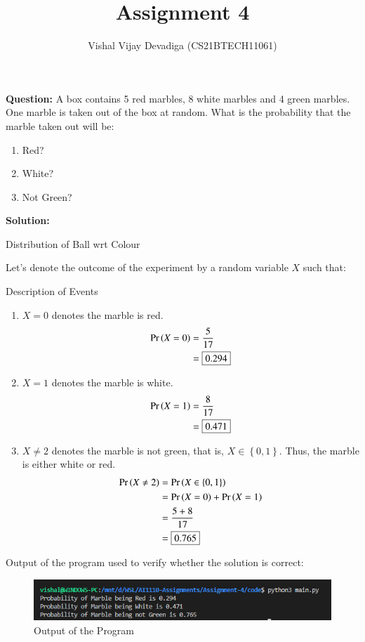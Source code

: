 \documentclass[journal,12pt,twocolumn]{IEEEtran}
\title{Assignment 4}
\author{Vishal Vijay Devadiga (CS21BTECH11061)}
\date{}
\providecommand{\pr}[1]{\ensuremath{\Pr\left(#1\right)}}
\providecommand{\cbrak}[1]{\ensuremath{\left\{#1\right\}}}
\newcommand{\question}{\noindent \textbf{Question: }}
\newcommand{\solution}{\noindent \textbf{Solution: }}
\begin{document}
\maketitle
\question
A box contains 5 red marbles, 8 white marbles and 4 green marbles. One marble is taken
out of the box at random. What is the probability that the marble taken out will be:
\begin{enumerate}[label=(\roman{enumi})]
	\item Red?
	\item White?
	\item Not Green?
\end{enumerate}
\solution
\begin{table}[H]
	
	\caption{Distribution of Ball wrt Colour}
	\label{tab1}
\end{table}
Let's denote the outcome of the experiment by a random variable $X$ such that:
\begin{table}[H]
	
	\caption{Description of Events}
	\label{tab2}
\end{table}
\begin{enumerate}[label=(\roman{enumi})]
    \item $X = 0$ denotes the marble is red.
    \begin{align}
        \pr{X = 0} & = \frac{5}{17} 
	    \\
	    & = \fbox{0.294}
    \end{align}
    \item $X = 1$ denotes the marble is white.
    \begin{align}
        \pr{X = 1} & = \frac{8}{17} 
	    \\
	    & = \fbox{0.471}
    \end{align}
    \item $X \not = 2$ denotes the marble is not green, that is,
	$X \in \cbrak{0,1}$. Thus, the marble is either white or red.
    \begin{align}
        \pr{X \not = 2} & = \pr{X \in \cbrak{0,1}}
		\\
		& = \pr{X = 0} + \pr{X = 1}
		\\
		& =\frac{5+8}{17}
	    \\
	    & = \fbox{0.765}
    \end{align}
\end{enumerate}
Output of the program used to verify whether the solution is correct:
\begin{figure}[H]
	\centering
	\includegraphics[width = \columnwidth]{./figure/Output.png}
	\caption{Output of the Program}
	\label{fig1}
\end{figure}
\end{document}
